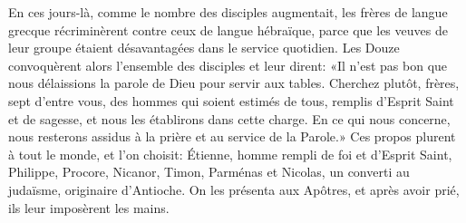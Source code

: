 En ces jours-là, comme le nombre des disciples augmentait,
	les frères de langue grecque récriminèrent contre ceux de langue hébraïque,
	parce que les veuves de leur groupe étaient désavantagées
		dans le service quotidien.
Les Douze convoquèrent alors l’ensemble des disciples et leur dirent:
	«Il n’est pas bon que nous délaissions la parole de Dieu
		pour servir aux tables.
Cherchez plutôt, frères, sept d’entre vous,
	des hommes qui soient estimés de tous,
		remplis d’Esprit Saint et de sagesse,
		et nous les établirons dans cette charge.
En ce qui nous concerne,
	nous resterons assidus à la prière et au service de la Parole.»
Ces propos plurent à tout le monde, et l’on choisit:
	Étienne, homme rempli de foi et d’Esprit Saint,
	Philippe, Procore, Nicanor, Timon, Parménas
	et Nicolas, un converti au judaïsme, originaire d’Antioche.
On les présenta aux Apôtres,
	et après avoir prié, ils leur imposèrent les mains.
